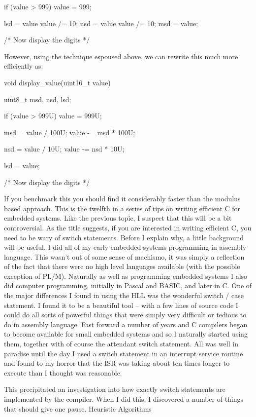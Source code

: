 {{{{{{{{{{{ if (value > 999)
 {
 value = 999;
 }

 lsd = value %
 value /= 10;
 nsd = value %
 value /= 10;
 msd = value;

 /* Now display the digits */
}

However, using the technique espoused above, we can rewrite this much more efficiently as:

void display_value(uint16_t value)
{
 uint8_t    msd, nsd, lsd;

 if (value > 999U)
 {
  value = 999U;
 }

 msd = value / 100U;
 value -= msd * 100U;

 nsd = value / 10U;
 value -= nsd * 10U;

 lsd = value;

 /* Now display the digits */
}

If you benchmark this you should find it considerably faster than the modulus based approach.
This is the twelfth in a series of tips on writing efficient C for embedded systems. Like the previous topic, I suspect that this will be a bit controversial. As the title suggests, if you are interested in writing efficient C, you need to be wary of switch statements. Before I explain why, a little background will be useful. I did all of my early embedded systems programming in assembly language. This wasn’t out of some sense of machismo, it was simply a reflection of the fact that there were no high level languages available (with the possible exception of PL/M). Naturally as well as programming embedded systems I also did computer programming, initially in Pascal and BASIC, and later in C. One of the major differences I found in using the HLL was the wonderful switch / case statement. I found it to be a beautiful tool – with a few lines of source code I could do all sorts of powerful things that were simply very difficult or tedious to do in assembly language. Fast forward a number of years and C compilers began to become available for small embedded systems and so I naturally started using them, together with of course the attendant switch statement. All was well in paradise until the day I used a switch statement in an interrupt service routine and found to my horror that the ISR was taking about ten times longer to execute than I thought was reasonable.

This precipitated an investigation into how exactly switch statements are implemented by the compiler. When I did this, I discovered a number of things that should give one pause.
Heuristic Algorithms

}}}}}}}}}}
